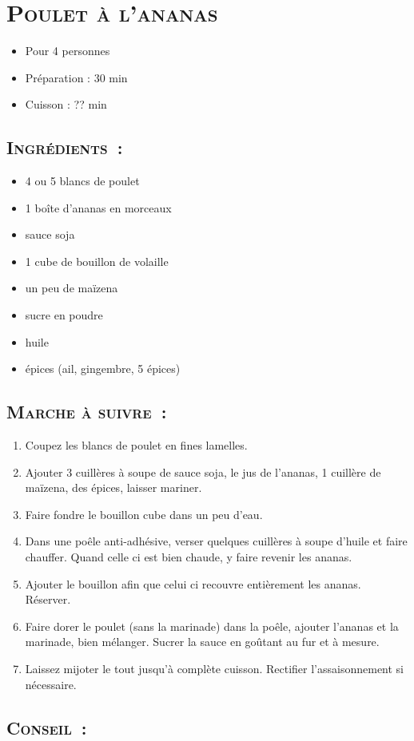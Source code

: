 \section[\normalsize{Poulet \`a l'ananas}]{\LARGE{\textsc{Poulet \`a l'ananas}}}		%


\begin{itemize}
\item Pour 4 personnes
\item Préparation : 30 min
\item Cuisson : ?? min
\end{itemize}

\subsection*{\textsc{Ingr\'edients~:}}

\begin{itemize}
\item 4 ou 5 blancs de poulet
\item 1 bo\^ite d'ananas en morceaux
\item sauce soja
\item 1 cube de bouillon de volaille
\item un peu de maïzena
\item sucre en poudre
\item huile
\item \'epices (ail, gingembre, 5 \'epices) 
\end{itemize}


\subsection*{\textsc{Marche \`a suivre~:}}

\begin{enumerate}
\item Coupez les blancs de poulet en fines lamelles. 
\item Ajouter 3 cuill\`eres \`a soupe de sauce soja, le jus de l'ananas, 1 cuill\`ere de maïzena, des \'epices, laisser mariner.
\item Faire fondre le bouillon cube dans un peu d'eau.
\item Dans une po\^ele anti-adh\'esive, verser quelques cuill\`eres \`a soupe d'huile et faire chauffer. Quand celle ci est bien chaude, y faire revenir les ananas. 
\item Ajouter le bouillon afin que celui ci recouvre enti\`erement les ananas. R\'eserver.
\item Faire dorer le poulet (sans la marinade) dans la po\^ele, ajouter l'ananas et la marinade, bien m\'elanger. Sucrer la sauce en goûtant au fur et \`a mesure.
\item Laissez mijoter le tout jusqu'\`a compl\`ete cuisson. Rectifier l'assaisonnement si n\'ecessaire.
\end{enumerate}
\subsection*{\textsc{Conseil~:}}

